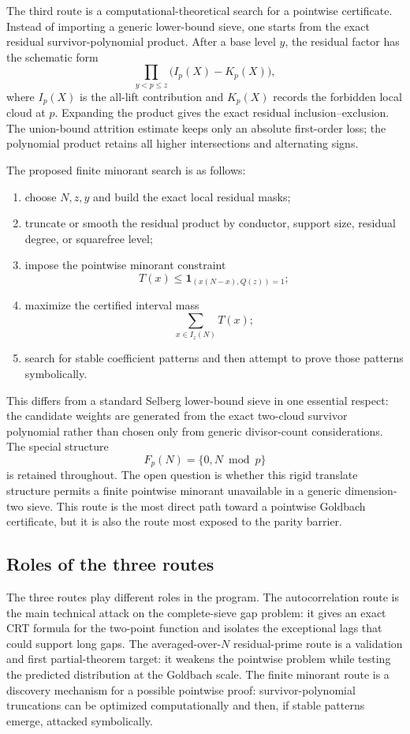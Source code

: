 \documentclass[11pt]{article}
\theoremstyle{plain}
\theoremstyle{definition}
\theoremstyle{remark}
\newcommand{\one}{\mathbf 1}
\begin{document}
The third route is a computational-theoretical search for a pointwise
certificate.  Instead of importing a generic lower-bound sieve, one starts from
the exact residual survivor-polynomial product.  After a base level \(y\), the
residual factor has the schematic form
\[
\prod_{y<p\le z}\bigl(I_p(X)-K_p(X)\bigr),
\]
where \(I_p(X)\) is the all-lift contribution and \(K_p(X)\) records the
forbidden local cloud at \(p\).  Expanding the product gives the exact residual
inclusion--exclusion.  The union-bound attrition estimate keeps only an
absolute first-order loss; the polynomial product retains all higher
intersections and alternating signs.

The proposed finite minorant search is as follows:
\begin{enumerate}[label=(\roman*),leftmargin=2em]
\item choose \(N,z,y\) and build the exact local residual masks;
\item truncate or smooth the residual product by conductor, support size,
residual degree, or squarefree level;
\item impose the pointwise minorant constraint
\[
T(x)\le \one_{(x(N-x),Q(z))=1};
\]
\item maximize the certified interval mass
\[
\sum_{x\in I_z(N)}T(x);
\]
\item search for stable coefficient patterns and then attempt to prove those
patterns symbolically.
\end{enumerate}

This differs from a standard Selberg lower-bound sieve in one essential respect:
the candidate weights are generated from the exact two-cloud survivor polynomial
rather than chosen only from generic divisor-count considerations.  The special
structure
\[
F_p(N)=\{0,N\bmod p\}
\]
is retained throughout.  The open question is whether this rigid translate
structure permits a finite pointwise minorant unavailable in a generic
dimension-two sieve.  This route is the most direct path toward a pointwise
Goldbach certificate, but it is also the route most exposed to the parity
barrier.

\subsection{Roles of the three routes}

The three routes play different roles in the program.  The autocorrelation
route is the main technical attack on the complete-sieve gap problem: it gives
an exact CRT formula for the two-point function and isolates the exceptional
lags that could support long gaps.  The averaged-over-\(N\) residual-prime route
is a validation and first partial-theorem target: it weakens the pointwise
problem while testing the predicted distribution at the Goldbach scale.  The
finite minorant route is a discovery mechanism for a possible pointwise proof:
survivor-polynomial truncations can be optimized computationally and then, if
stable patterns emerge, attacked symbolically.
\end{document}

